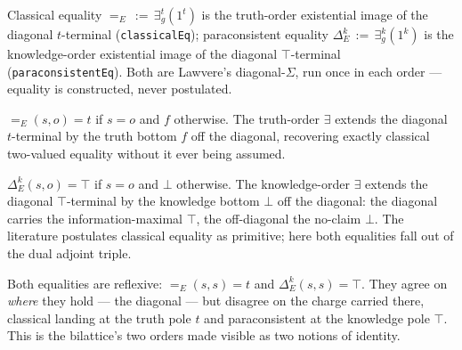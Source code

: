 \begin{definition}\label{def:classicalEq}\leanok{}
Classical equality $=_E\,:=\,\exists^{t}_{g}(1^{t})$ is the truth-order
existential image of the diagonal $t$-terminal (\texttt{classicalEq});
paraconsistent equality $\Delta^{k}_E\,:=\,\exists^{k}_{g}(1^{k})$ is the
knowledge-order existential image of the diagonal $\top$-terminal
(\texttt{paraconsistentEq}). Both are Lawvere's diagonal-$\Sigma$, run once in
each order --- equality is constructed, never postulated.
\end{definition}

\begin{theorem}\label{thm:classicalEq-eq}\leanok{}
$=_E(s,o) = t$ if $s = o$ and $f$ otherwise. The truth-order $\exists$ extends the
diagonal $t$-terminal by the truth bottom $f$ off the diagonal, recovering exactly
classical two-valued equality without it ever being assumed.
\end{theorem}

\begin{theorem}\label{thm:paraconsistentEq-eq}\leanok{}
$\Delta^{k}_E(s,o) = \top$ if $s = o$ and $\bot$ otherwise. The knowledge-order
$\exists$ extends the diagonal $\top$-terminal by the knowledge bottom $\bot$ off
the diagonal: the diagonal carries the information-maximal $\top$, the off-diagonal
the no-claim $\bot$. The literature postulates classical equality as primitive;
here both equalities fall out of the dual adjoint triple.
\end{theorem}

\begin{corollary}\label{cor:eq-refl}\leanok{}
Both equalities are reflexive: $=_E(s,s) = t$ and $\Delta^{k}_E(s,s) = \top$. They
agree on \emph{where} they hold --- the diagonal --- but disagree on the charge
carried there, classical landing at the truth pole $t$ and paraconsistent at the
knowledge pole $\top$. This is the bilattice's two orders made visible as two
notions of identity.
\end{corollary}

